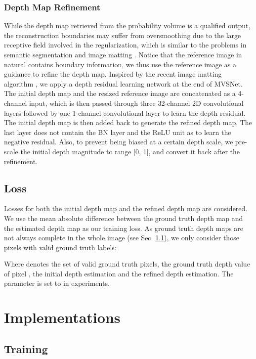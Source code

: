 \documentclass[runningheads]{llncs}
\begin{document}
\vspace{-3mm}
\subsubsection{Depth Map Refinement} While the depth map retrieved from the probability volume is a qualified output, the reconstruction boundaries may suffer from oversmoothing due to the large receptive field involved in the regularization, which is similar to the problems in semantic segmentation \cite{chen2017deeplab} and image matting \cite{xu2017deep}. Notice that the reference image in natural contains boundary information, we thus use the reference image as a guidance to refine the depth map. Inspired by the recent image matting algorithm \cite{xu2017deep}, we apply a depth residual learning network at the end of MVSNet. The initial depth map and the resized reference image are concatenated as a 4-channel input, which is then passed through three 32-channel 2D convolutional layers followed by one 1-channel convolutional layer to learn the depth residual. The initial depth map is then added back to generate the refined depth map. The last layer does not contain the BN layer and the ReLU unit as to learn the negative residual. Also, to prevent being biased at a certain depth scale, we pre-scale the initial depth magnitude to range [0, 1], and convert it back after the refinement. 

\subsection{Loss}

Losses for both the initial depth map and the refined depth map are considered. We use the mean absolute difference between the ground truth depth map and the estimated depth map as our training loss. As ground truth depth maps are not always complete in the whole image (see Sec. \ref{sec:train}), we only consider those pixels with valid ground truth labels:
	
Where  denotes the set of valid ground truth pixels,  the ground truth depth value of pixel ,  the initial depth estimation and  the refined depth estimation. The parameter  is set to  in experiments.



\section{Implementations}

\subsection{Training} \label{sec:train}
\end{document}
